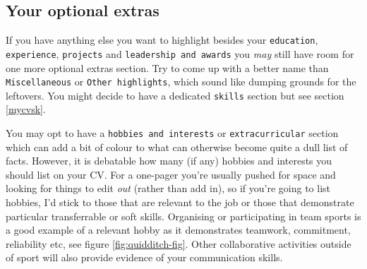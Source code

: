 \documentclass[
]{book}
\begin{document}
\hypertarget{misc}{%
\subsection{Your optional extras}\label{misc}}

If you have anything else you want to highlight besides your \texttt{education}, \texttt{experience}, \texttt{projects} and \texttt{leadership\ and\ awards} you \emph{may} still have room for one more optional extras section. Try to come up with a better name than \texttt{Miscellaneous} or \texttt{Other\ highlights}, which sound like dumping grounds for the leftovers. You might decide to have a dedicated \texttt{skills} section but see section \ref{mycvsk}.

You may opt to have a \texttt{hobbies\ and\ interests} or \texttt{extracurricular} section which can add a bit of colour to what can otherwise become quite a dull list of facts. However, it is debatable how many (if any) hobbies and interests you should list on your CV. For a one-pager you're usually pushed for space and looking for things to edit \emph{out} (rather than add in), so if you're going to list hobbies, I'd stick to those that are relevant to the job or those that demonstrate particular transferrable or soft skills. Organising or participating in team sports is a good example of a relevant hobby as it demonstrates teamwork, commitment, reliability etc, see figure \ref{fig:quidditch-fig}. Other collaborative activities outside of sport will also provide evidence of your communication skills. \citep{hobbies}
\end{document}
